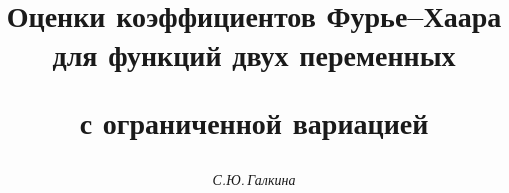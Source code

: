 









\newcommand{\VLD}{V_L(D)}


\newcommand{\D}{\overline D}


\newcommand{\V}[4]{V{}_{#1}^{#2}\,{}_{#3}^{#4}}


\newcommand{\tts}[1]{}







\setcounter{page}{69}















\author{\it С.Ю.\,Галкина}




\title{Оценки коэффициентов Фурье--Хаара для функций двух переменных


с ограниченной вариацией}





\date{}




\pagestyle{plain} %







\maketitle


